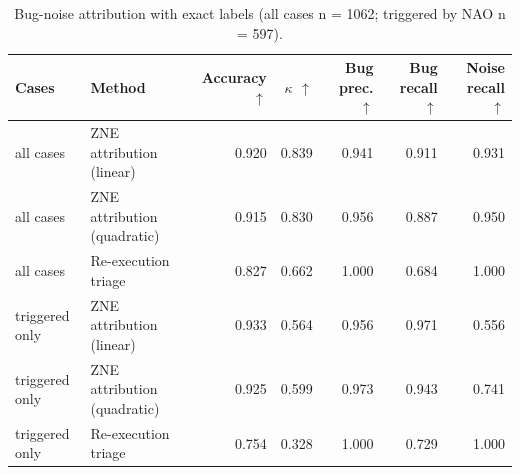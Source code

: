 \begin{table}[t]
\centering
\caption{Bug-noise attribution with exact labels (all cases n = 1062; triggered by NAO n = 597).}
\label{tab:rq3-attribution}
\small
\begin{tabular}{llrrrrr}
\toprule
Cases & Method & Accuracy $\uparrow$ & $\kappa$ $\uparrow$ & Bug prec. $\uparrow$ & Bug recall $\uparrow$ & Noise recall $\uparrow$ \\
\midrule
all cases & ZNE attribution (linear) & 0.920 & 0.839 & 0.941 & 0.911 & 0.931 \\
all cases & ZNE attribution (quadratic) & 0.915 & 0.830 & 0.956 & 0.887 & 0.950 \\
all cases & Re-execution triage & 0.827 & 0.662 & 1.000 & 0.684 & 1.000 \\
triggered only & ZNE attribution (linear) & 0.933 & 0.564 & 0.956 & 0.971 & 0.556 \\
triggered only & ZNE attribution (quadratic) & 0.925 & 0.599 & 0.973 & 0.943 & 0.741 \\
triggered only & Re-execution triage & 0.754 & 0.328 & 1.000 & 0.729 & 1.000 \\
\bottomrule
\end{tabular}
\end{table}
